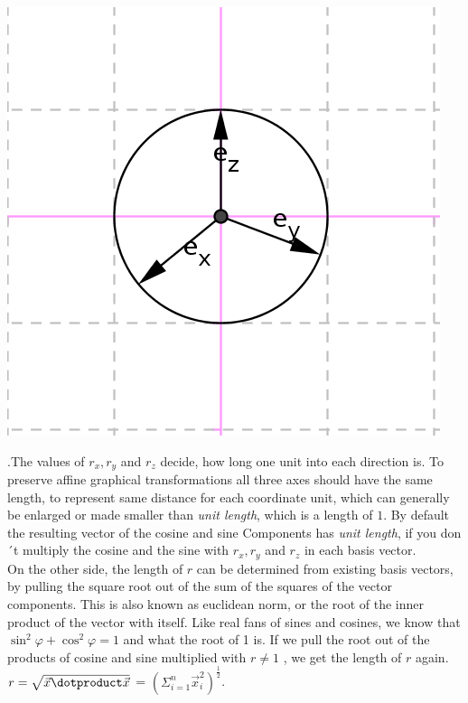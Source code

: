 \documentclass{article}
\begin{document}
\begin{center}
\includegraphics[scale=1]{unitvectors.png}
\end{center}

.The values of $r_x, r_y$ and $r_z$ decide, how long one unit into each
direction is. To preserve affine graphical transformations all three
axes should have the same length, to represent same distance for each coordinate unit, 
which can generally be enlarged or made smaller than \emph{unit length}, which is a length of $1$. 
By default the resulting vector of the cosine and sine Components has \emph{unit length}, 
if you don´t multiply the cosine and the sine with $r_x, r_y$ and $r_z$ in each basis vector. \\

 On the other side, the length of $r$ can be determined from existing basis vectors, 
by pulling the square root out of the sum of the squares of the vector components.
This is also known as euclidean norm, or the root of the inner product of the vector with itself.
Like real fans of sines and cosines, we know that $\sin^2 \varphi + \cos^2 \varphi = 1$ and what the root of 1 is.
If we pull the root out of the products of cosine and sine multiplied with $r \ne 1$ , we get the length of $r$ again. 
$r = \sqrt{\vec{x} \dotproduct \vec{x}}$ = $\left(\Sigma_{i=1}^{n} \vec{x}_i^2\right)^{\frac{1}{2}}$.\\
\end{document}
